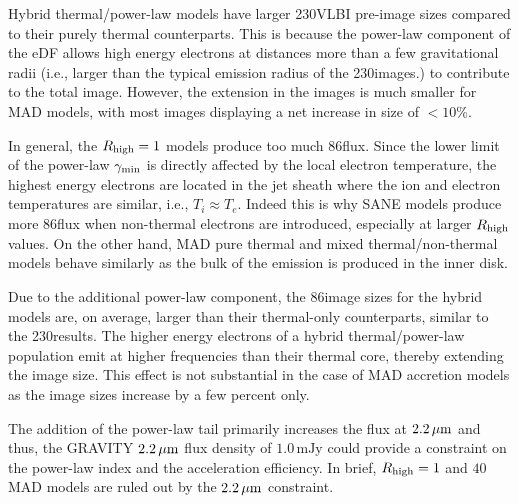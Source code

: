 Hybrid thermal/power-law models have larger 230\GHz VLBI pre-image sizes compared to their purely thermal counterparts.
This is because the power-law component of the eDF allows high energy electrons at distances more than a few gravitational radii (i.e., larger than the typical emission radius of the 230\GHz images.) to contribute to the total image.
However, the extension in the images is much smaller for MAD models, with most images displaying a net increase in size of $<10\%$.


In general, the $R_{\rm high}=1$ models produce too much 86\GHz flux.
Since the lower limit of the power-law $\gamma_{\rm min}$ is directly affected by the local electron temperature, the highest energy electrons are located in the jet sheath where the ion and electron temperatures are similar, i.e., $T_i \approx T_e$.
Indeed this is why SANE models produce more 86\GHz flux when non-thermal electrons are introduced, especially at larger $R_\mathrm{high}$ values.
On the other hand, MAD pure thermal and mixed thermal/non-thermal models behave similarly as the bulk of the emission is produced in the inner disk.

Due to the additional power-law component, the 86\GHz image sizes for the hybrid \hamr models are, on average, larger than their thermal-only counterparts, similar to the 230\GHz results.
The higher energy electrons of a hybrid thermal/power-law population emit at higher frequencies than their thermal core, thereby extending the image size.
This effect is not substantial in the case of MAD accretion models as the image sizes increase by a few percent only.


The addition of the power-law tail primarily increases the flux at $2.2\,\mu\mathrm{m}$ and thus, the GRAVITY $2.2\,\mu\mathrm{m}$ flux density of $1.0\,\mathrm{mJy}$ could provide a constraint on the power-law index and the acceleration efficiency.
In brief, $R_\mathrm{high}=1$ and $40$ MAD models are ruled out by the $2.2\,\mu\mathrm{m}$ constraint.


